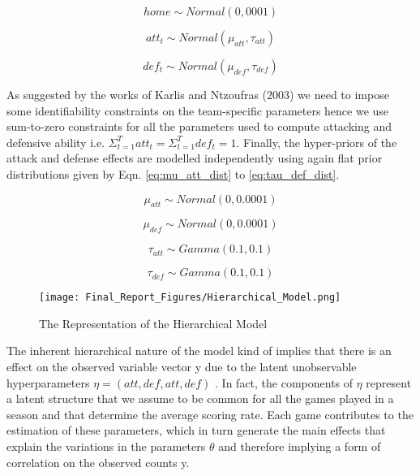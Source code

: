 \documentclass{article}
\begin{document}
\begin{equation}
home \sim Normal(0, 0001)
\label{eq:home_dist}
\end{equation}

\begin{equation}
att_t \sim Normal(\mu_{att}, \tau_{att})
\label{eq:att_dist}
\end{equation}

\begin{equation}
def_t \sim Normal(\mu_{def}, \tau_{def})
\label{eq:def_dist}
\end{equation}

As suggested by the works of Karlis and Ntzoufras (2003) we need to impose some identifiability constraints on the team-specific parameters hence we use sum-to-zero constraints for all the parameters used to compute attacking and defensive ability i.e. $\Sigma_{t=1}^{T} att_{t} = \Sigma_{t=1}^{T} def_{t}=1$. Finally, the hyper-priors of the attack and defense effects are modelled independently using again flat prior distributions given by Eqn. \ref{eq:mu_att_dist} to \ref{eq:tau_def_dist}.

\begin{equation}
\mu_{att} \sim Normal(0, 0.0001)
\label{eq:mu_att_dist}
\end{equation}

\begin{equation}
\mu_{def} \sim Normal(0, 0.0001)
\label{eq:mu_def_dist}
\end{equation}

\begin{equation}
\tau_{att} \sim Gamma(0.1, 0.1)
\label{eq:tau_att_dist}
\end{equation}

\begin{equation}
\tau_{def} \sim Gamma(0.1, 0.1)
\label{eq:tau_def_dist}
\end{equation}

\begin{figure*}[!htb]
\centering
\texttt{[image: Final\_Report\_Figures/Hierarchical\_Model.png]}
\caption{The Representation of the Hierarchical Model}
\label{fig:hierarchical_model}
\end{figure*}

The inherent hierarchical nature of the model kind of implies that there is an effect on the observed variable vector y due to the latent unobservable hyperparameters $\eta= (att, def , att , def)$ . In fact, the components of $\eta$ represent a latent structure that we assume to be common for all the games played in a season and that determine the average scoring rate. Each game contributes to the estimation of these parameters, which in turn generate the main effects that explain the variations in the parameters $\theta$ and therefore implying a form of correlation on the observed counts y. 
\end{document}
